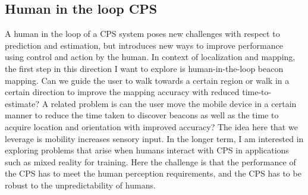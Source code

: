 \documentclass[10pt]{article}
\begin{document}
\subsection{Human in the loop CPS}
A human in the loop of a CPS system poses new challenges with respect to prediction and estimation, but introduces new ways to improve performance using control and action by the human. In context of localization and mapping, the first step in this direction I want to explore is human-in-the-loop beacon mapping. Can we guide the user to walk towards a certain region or walk in a certain direction to improve the mapping accuracy with reduced time-to-estimate? A related problem is can the user move the mobile device in a certain manner to reduce the time taken to discover beacons as well as the time to acquire location and orientation with improved accuracy? The idea here that we leverage is mobility increases sensory input. In the longer term, I am interested in exploring problems that arise when humans interact with CPS in applications such as mixed reality for training. Here the challenge is that the performance of the CPS has to meet the human perception requirements, and the CPS has to be robust to the unpredictability of humans. 
\end{document}
